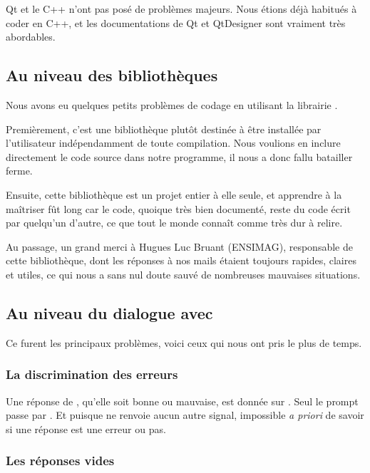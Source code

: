 		Qt et le C++ n'ont pas posé de problèmes majeurs. Nous étions déjà habitués à coder en C++, et les documentations de Qt et QtDesigner sont vraiment très abordables.
        
    \subsection{Au niveau des bibliothèques}
    
        Nous avons eu quelques petits problèmes de codage en utilisant la librairie \qcodeedit{}.

        Premièrement, c'est une bibliothèque plutôt destinée à être installée par l'utilisateur indépendamment de toute compilation.
        Nous voulions en inclure directement le code source dans notre programme, il nous a donc fallu batailler ferme.
        
        Ensuite, cette bibliothèque est un projet entier à elle seule, et apprendre à la maîtriser fût long car le code, quoique très bien documenté, reste du code écrit par quelqu'un d'autre, ce que tout le monde connaît comme très dur à relire.

        Au passage, un grand merci à Hugues Luc Bruant (ENSIMAG), responsable de cette bibliothèque, dont les réponses à nos mails étaient toujours rapides, claires et utiles, ce qui nous a sans nul doute sauvé de nombreuses mauvaises situations.
		
    \subsection{Au niveau du dialogue avec \coq{}}
    
        Ce furent les principaux problèmes, voici ceux qui nous ont pris le plus de temps.

        \subsubsection{La discrimination des erreurs}

        	Une réponse de \coqtop{}, qu'elle soit bonne ou mauvaise, est donnée sur \stdout{}. Seul le prompt passe par \stderr{}.
        	Et puisque \coqtop{} ne renvoie aucun autre signal, impossible \textit{a priori} de savoir si une réponse est une erreur ou pas.

        \subsubsection{Les réponses vides}

